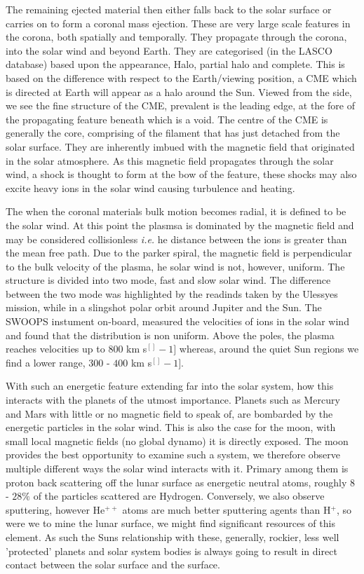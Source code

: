 The remaining ejected material then either falls back to the solar surface or carries on to form a coronal mass ejection.
These are very large scale features in the corona, both spatially and temporally.
They propagate through the corona, into the solar wind and beyond Earth.
They are categorised (in the LASCO database) based upon the appearance, Halo, partial halo and complete.
This is based on the difference with respect to the Earth/viewing position, a CME which is directed at Earth will appear as a halo around the Sun.
Viewed from the side, we see the fine structure of the CME, prevalent is the leading edge, at the fore of the propagating feature beneath which is a void.
The centre of the CME is generally the core, comprising of the filament that has just detached from the solar surface.
They are inherently imbued with the magnetic field that originated in the solar atmosphere.
As this magnetic field propagates through the solar wind, a shock is thought to form at the bow of the feature, these shocks may also excite heavy ions in the solar wind causing turbulence and heating.

The when the coronal materials bulk motion becomes radial, it is defined to be the solar wind.
At this point the plasmsa is dominated by the magnetic field and may be considered collisionless \emph{i.e.} he distance between the ions is greater than the mean free path.
Due to the parker spiral, the magnetic field is perpendicular to the bulk velocity of the plasma, he solar wind is not, however, uniform.
The structure is divided into two mode, fast and slow solar wind. 
The difference between the two mode was highlighted by the readinds taken by the Ulessyes mission, while in a slingshot polar orbit around Jupiter and the Sun.
The SWOOPS instument on-board, measured the velocities of ions in the solar wind and found that the distribution is non uniform.
Above the poles, the plasma reaches velocities up to $800$ km s${^[]-1]}$ whereas, around the quiet Sun regions we find a lower range, $300$ - $400$ km s${^[]-1]}$.

With such an energetic feature extending far into the solar system, how this interacts with the planets of the utmost importance.
Planets such as Mercury and Mars with little or no magnetic field to speak of, are bombarded by the energetic particles in the solar wind.
This is also the case for the moon, with small local magnetic fields (no global dynamo) it is directly exposed.
The moon provides the best opportunity to examine such a system, we therefore observe multiple different ways the solar wind interacts with it.
Primary among them is proton back scattering off the lunar surface as energetic neutral atoms, roughly $8$ - $28\%$ of the particles scattered are Hydrogen.
Conversely, we also observe sputtering, however He$^{++}$ atoms are much better sputtering agents than H$^{+}$, so were we to mine the lunar surface, we might find significant resources of this element. 
As such the Suns relationship with these, generally, rockier, less well 'protected' planets and solar system bodies is always going to result in direct contact between the solar surface and the surface.

